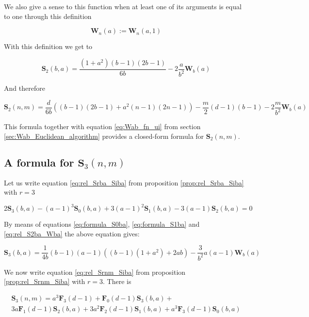 \documentclass{article}%
\newcommand{\SUMS}[3]{\mathbf{S}_{#1}\left(#2,#3\right)}
\newcommand{\SUMW}[2]{\mathbf{W}_{#1}\left(#2\right)}
\newcommand{\SUMF}[2]{\mathbf{F}_{#1}\left(#2\right)}
\begin{document}
We also give a sense to this function when at least one of its arguments is equal to one through this definition

\begin{equation} \label{eq:Wna}
\SUMW{n}{a}:=\SUMW{n}{a,1}
\end{equation}

With this definition we get to

\begin{equation} \label{eq:rel_S2ba_Wba}
\SUMS{2}{b}{a} = \frac{(1+a^2)(b-1)(2b-1)}{6b}-2\frac{a}{b^2}\SUMW{b}{a}
\end{equation}

And therefore

\begin{equation} \label{eq:rel_S2nm_Wba}
\SUMS{2}{n}{m} = \frac{d}{6b}\left((b-1)(2b-1)+a^2(n-1)(2n-1)\right)-\frac{m}{2}(d-1)(b-1)-2\frac{m}{b^2}\SUMW{b}{a}
\end{equation}

This formula together with equation \ref{eq:Wab_fn_ui} from section \ref{sec:Wab_Euclidean_algorithm} provides a closed-form formula for $\SUMS{2}{n}{m}$.

\subsection{A formula for $\SUMS{3}{n}{m}$}

Let us write equation \ref{eq:rel_Srba_Siba} from proposition \ref{prop:rel_Srba_Siba} with $r=3$

\begin{equation*}
2\SUMS{3}{b}{a}-(a-1)^3\SUMS{0}{b}{a}+3(a-1)^2\SUMS{1}{b}{a}-3(a-1)\SUMS{2}{b}{a} = 0
\end{equation*}

By means of equations \ref{eq:formula_S0ba}, \ref{eq:formula_S1ba} and \ref{eq:rel_S2ba_Wba} the above equation gives:

\begin{equation}
\SUMS{3}{b}{a}=\frac{1}{4b}(b-1)(a-1)\left((b-1)(1+a^2)+2ab\right)-\frac{3}{b^2}a(a-1)\SUMW{b}{a}
\label{eq:rel_S3ba_Wba}
\end{equation}

We now write equation \ref{eq:rel_Srnm_Siba} from proposition \ref{prop:rel_Srnm_Siba} with $r=3$. There is

\begin{multline*}
\SUMS{3}{n}{m} = a^3\SUMF{3}{d-1}+\SUMF{0}{d-1}\SUMS{3}{b}{a}+\\
3a\SUMF{1}{d-1}\SUMS{2}{b}{a}+3a^2\SUMF{2}{d-1}\SUMS{1}{b}{a}+a^3\SUMF{3}{d-1}\SUMS{0}{b}{a}
\end{multline*}
\end{document}
